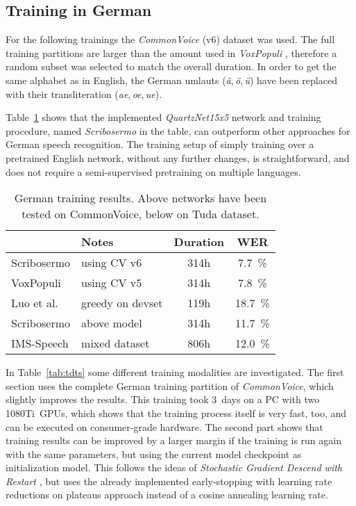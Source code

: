 \subsection{Training in German}

For the following trainings the \textit{CommonVoice} (v6) dataset was used. The full training partitions are larger than the amount used in \textit{VoxPopuli} \cite{VOXPOP}, therefore a random subset was selected to match the overall duration.
In order to get the same alphabet as in English, the German umlauts (\textit{ä},\,\textit{ö},\,\textit{ü}) have been replaced with their transliteration (\textit{ae},\,\textit{oe},\,\textit{ue}).

Table~\ref{tab:rqn} shows that the implemented \textit{QuartzNet15x5} network and training procedure, named \textit{Scribosermo} in the table, can outperform other approaches for German speech recognition. The training setup of simply training over a pretrained English network, without any further changes, is straightforward, and does not require a semi-supervised pretraining on multiple languages.

\begin{table}[!htbp]
	\caption{German training results. Above networks have been tested on CommonVoice, below on Tuda dataset.}
	\label{tab:rqn}
	\centering
	\begin{tabular}{llcc}
		\toprule
		\textbf{}  & \textbf{Notes}  & \textbf{Duration} & \textbf{WER} \\
		\midrule
		Scribosermo & using CV v6 & 314h  & \SI{7.7}{\percent} \\
		VoxPopuli \cite{VOXPOP} & using CV v5 & 314h &
		\SI{7.8}{\percent} \\
		Luo et al. \cite{QNTECR} & greedy on devset & 119h &
		\SI{18.7}{\percent} \\
		\midrule
		Scribosermo & above model & 314h & \SI{11.7}{\percent} \\
		IMS-Speech \cite{IMSDE} & mixed dataset & 806h & \SI{12.0}{\percent} \\
		\bottomrule
	\end{tabular}
\end{table}

In Table~\ref{tab:tdts} some different training modalities are investigated. The first section uses the complete German training partition of \textit{CommonVoice}, which slightly improves the results. This training took 3~days on a PC with two \mbox{1080Ti GPUs}, which shows that the training process itself is very fast, too, and can be executed on consumer-grade hardware.
The second part shows that training results can be improved by a larger margin if the training is run again with the same parameters, but using the current model checkpoint as initialization model. This follows the ideas of \textit{Stochastic Gradient Descend with Restart} \cite{SGDR}, but uses the already implemented early-stopping with learning rate reductions on plateaus approach instead of a cosine annealing learning rate.

